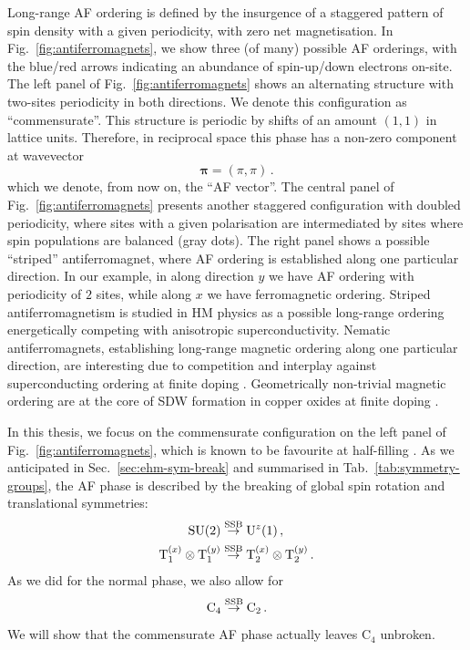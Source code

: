 Long-range AF ordering is defined by the insurgence of a staggered pattern of spin density with a given periodicity, with zero net magnetisation. In Fig.~\ref{fig:antiferromagnets}, we show three (of many) possible AF orderings, with the blue/red arrows indicating an abundance of spin-up/down electrons on-site.
The left panel of Fig.~\ref{fig:antiferromagnets} shows an alternating structure with two-sites periodicity in both directions. We denote this configuration as ``commensurate''. This structure is periodic by shifts of an amount $(1,1)$ in lattice units. Therefore, in reciprocal space this phase has a non-zero component at wavevector
\begin{equation}\label{eq:af-pi}
	\bm{\pi} = (\pi,\pi) \, .
\end{equation}
which we denote, from now on, the ``AF vector''.
The central panel of Fig.~\ref{fig:antiferromagnets} presents another staggered configuration with doubled periodicity, where sites with a given polarisation are intermediated by sites where spin populations are balanced (gray dots). The right panel shows a possible ``striped'' antiferromagnet, where AF ordering is established along one particular direction. In our example, in along direction $y$ we have AF ordering with periodicity of $2$ sites, while along $x$ we have ferromagnetic ordering. Striped antiferromagnetism is studied in HM physics \cite{wietek2021stripes} as a possible long-range ordering energetically competing with anisotropic superconductivity. Nematic antiferromagnets, establishing long-range magnetic ordering along one particular direction, are interesting due to competition and interplay against superconducting ordering at finite doping \cite{qin2020absence}. Geometrically non-trivial magnetic ordering are at the core of SDW formation in copper oxides at finite doping \cite{zaanen1989charged,kato1990soliton}.

In this thesis, we focus on the commensurate configuration on the left panel of Fig.~\ref{fig:antiferromagnets}, which is known to be favourite at half-filling \cite{keimer2015quantum}. As we anticipated in Sec.~\ref{sec:ehm-sym-break} and summarised in Tab.~\ref{tab:symmetry-groups}, the AF phase is described by the breaking of global spin rotation and translational symmetries:
\[
\begin{aligned}
	\mathrm{SU}(2) &\stackrel{\mathrm{SSB}}{\to} \mathrm{U}^z(1) \, , \\
	\mathrm{T}_1^{(x)} \otimes \mathrm{T}_1^{(y)} &\stackrel{\mathrm{SSB}}{\to} \mathrm{T}_2^{(x)} \otimes \mathrm{T}_2^{(y)} \, .
\end{aligned}
\]
As we did for the normal phase, we also allow for
\[
\mathrm{C}_4 \stackrel{\mathrm{SSB}}{\to} \mathrm{C}_2 \, .
\]
We will show that the commensurate AF phase actually leaves $\mathrm{C}_4$ unbroken.

